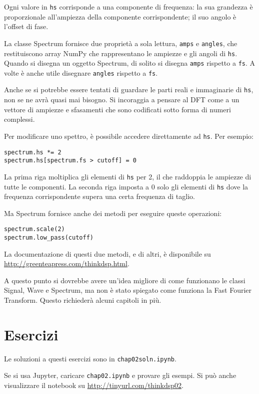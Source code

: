 \documentclass[12pt,a4paper]{book}
\begin{document}
Ogni valore in {\tt hs} corrisponde a una componente di frequenza: la sua grandezza è proporzionale all'ampiezza della componente corrispondente; il suo angolo è l'offset di fase.

La classe Spectrum fornisce due proprietà a sola lettura, {\tt amps} e {\tt angles}, che restituiscono array NumPy che rappresentano le ampiezze e gli angoli di {\tt hs}. Quando si disegna un oggetto Spectrum, di solito si disegna {\tt amps} rispetto a {\tt fs}. A volte è anche utile disegnare {\tt angles} rispetto a {\tt fs}.

Anche se si potrebbe essere tentati di guardare le parti reali e immaginarie di {\tt hs}, non se ne avrà quasi mai bisogno. Si incoraggia a pensare al DFT come a un vettore di ampiezze e sfasamenti che sono codificati sotto forma di numeri complessi.

Per modificare uno spettro, è possibile accedere direttamente ad {\tt hs}. Per esempio:

\begin{verbatim} 
spectrum.hs *= 2
spectrum.hs[spectrum.fs > cutoff] = 0
 \end{verbatim} 

La prima riga moltiplica gli elementi di {\tt hs} per 2, il che raddoppia le ampiezze di tutte le componenti. La seconda riga imposta a 0 solo gli elementi di {\tt hs} dove la frequenza corrispondente supera una certa frequenza di taglio.

Ma Spectrum fornisce anche dei metodi per eseguire queste operazioni:

\begin{verbatim} 
spectrum.scale(2)
spectrum.low_pass(cutoff)
 \end{verbatim} 

La documentazione di questi due metodi, e di altri, è disponibile su \url{http://greenteapress.com/thinkdsp.html}.

A questo punto si dovrebbe avere un'idea migliore di come funzionano le classi Signal, Wave e Spectrum, ma non è stato spiegato come funziona la Fast Fourier Transform. Questo richiederà alcuni capitoli in più.

\section{Esercizi} 

Le soluzioni a questi esercizi sono in {\tt chap02soln.ipynb}.

\begin{exercise} Se si usa Jupyter, caricare {\tt chap02.ipynb} e provare gli esempi. Si può anche visualizzare il notebook su \url{http://tinyurl.com/thinkdsp02}. \end{exercise} 
\end{document}
